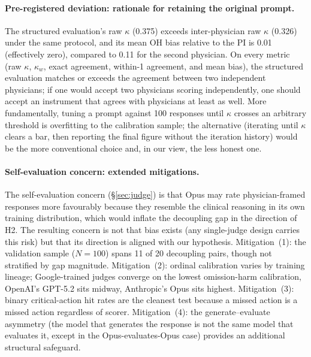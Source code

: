 \documentclass{article}
\begin{document}
\paragraph{Pre-registered deviation: rationale for retaining the original prompt.}
The structured evaluation's raw $\kappa$ (0.375) exceeds inter-physician raw $\kappa$ (0.326) under the same protocol, and its mean OH bias relative to the PI is 0.01 (effectively zero), compared to 0.11 for the second physician.
On every metric (raw $\kappa$, $\kappa_w$, exact agreement, within-1 agreement, and mean bias), the structured evaluation matches or exceeds the agreement between two independent physicians; if one would accept two physicians scoring independently, one should accept an instrument that agrees with physicians at least as well.
More fundamentally, tuning a prompt against 100 responses until $\kappa$ crosses an arbitrary threshold is overfitting to the calibration sample; the alternative (iterating until $\kappa$ clears a bar, then reporting the final figure without the iteration history) would be the more conventional choice and, in our view, the less honest one.

\paragraph{Self-evaluation concern: extended mitigations.}
The self-evaluation concern (\S\ref{sec:judge}) is that Opus may rate physician-framed responses more favourably because they resemble the clinical reasoning in its own training distribution, which would inflate the decoupling gap in the direction of H2.
The resulting concern is not that bias exists (any single-judge design carries this risk) but that its direction is aligned with our hypothesis.
Mitigation~(1): the validation sample ($N = 100$) spans 11 of 20 decoupling pairs, though not stratified by gap magnitude.
Mitigation~(2): ordinal calibration varies by training lineage; Google-trained judges converge on the lowest omission-harm calibration, OpenAI's GPT-5.2 sits midway, Anthropic's Opus sits highest.
Mitigation~(3): binary critical-action hit rates are the cleanest test because a missed action is a missed action regardless of scorer.
Mitigation~(4): the generate--evaluate asymmetry (the model that generates the response is not the same model that evaluates it, except in the Opus-evaluates-Opus case) provides an additional structural safeguard.
\end{document}
